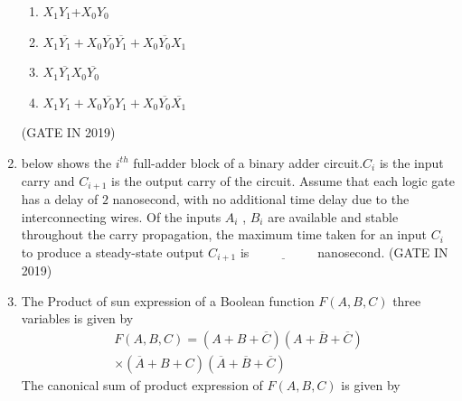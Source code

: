 \begin{enumerate}[label=\arabic*.,ref=\theenumi]
\begin{enumerate}
                        \item$X_1Y_1$+$X_0Y_0$
                        \item$X_1\overline{Y_1}+X_0\overline{Y_0}\overline{Y_1}+X_0\overline{Y_0}X_1$
                        \item$X_1\overline{Y_1}X_0\overline{Y_0}$
                        \item$X_1Y_1+X_0\overline{Y_0}Y_1+X_0\overline{Y_0}\overline{X_1}$
                  \end{enumerate}
            \hfill(GATE IN 2019)
\item
\label{prob:gate IN 22}
     below shows the $i^{th}$ full-adder block of a binary adder circuit.$C_{i}$  is the input carry and $C_{i+1}$ is the output carry of the circuit. Assume that each logic gate has a delay of $2$ nanosecond, with no additional time delay due to the interconnecting wires. Of the inputs $A_{i}$ , $B_{i}$ are available and stable throughout the carry propagation, the maximum time taken for an input $C_{i}$ to produce a steady-state output $C_{i+1}$ is $\underline{\hspace{2cm}}$ nanosecond.
     \hfill(GATE IN 2019)
     \begin{figure}[!ht]
	     \centering
\caption{}
\label{figiure_kmap}
\end{figure}
\item
\label{prob:gate IN 43}
The Product of sun expression of a Boolean function
                $F(A,B,C)$ three variables is given by 
                \begin{multline}
			F(A,B,C)=(A+B+\overline{C})(A+\overline{B}+\overline{C})
			\\
			\times (\overline{A}+B+C)(\overline{A}+\overline{B}+\overline{C})
                \end{multline}
                The canonical sum of product expression of $F(A,B,C)$ is given by 
                 \begin{enumerate}
 

\end{enumerate}
\end{enumerate}
